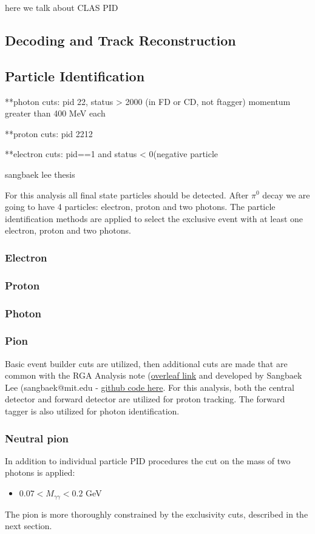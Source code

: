 here we talk about CLAS PID
\subsection{Decoding and Track Reconstruction}\label{sec:decrec}

\subsection{Particle Identification}
**photon cuts:
pid 22, status > 2000 (in FD or CD, not ftagger)
momentum greater than 400 MeV each

**proton cuts: pid 2212

**electron cuts: pid==1 and status < 0(negative particle

sangbaek lee thesis \parencite{Lee2022MeasurementDetector}

For this analysis all final state particles should be detected.
After $\pi^0$ decay we are going to have 4 particles: electron, proton and two photons.
The particle identification methods are applied to select the exclusive event with at least one electron, proton and two photons. 


    \subsubsection{Electron}
    \subsubsection{Proton}
    \subsubsection{Photon}
    \subsubsection{Pion}
    
    Basic event builder cuts are utilized, then additional cuts are made that are common with the RGA Analysis note (\href{https://www.overleaf.com/project/5ea737720942930001ff5e9c}{overleaf link} and developed by Sangbaek Lee (sangbaek@mit.edu - \href{https://github.com/Sangbaek/analysis_code/tree/analysis/pid}{github code here}. For this analysis, both the central detector and forward detector are utilized for proton tracking. The forward tagger is also utilized for photon identification. 
    


\subsubsection{Neutral pion}
    In addition to individual particle PID procedures the cut on the mass of two photons is applied:
    \begin{itemize}
    	\item $0.07<M_{\gamma\gamma}<0.2$ GeV
    \end{itemize}
    The pion is more thoroughly constrained by the exclusivity cuts, described in the next section.
    

